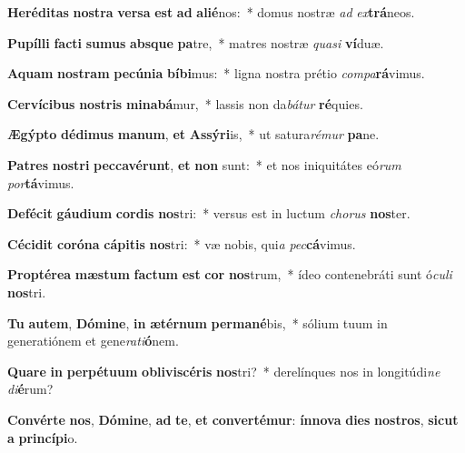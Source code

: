 \item \textbf{He}\textbf{ré}\textbf{di}\textbf{tas} \textbf{nos}\textbf{tra} \textbf{ver}\textbf{sa} \textbf{est} \textbf{ad} \textbf{a}\textbf{li}\textbf{é}nos:~* domus nostræ \textit{ad} \textit{ex}\textbf{trá}neos.
\item \textbf{Pu}\textbf{píl}\textbf{li} \textbf{fac}\textbf{ti} \textbf{su}\textbf{mus} \textbf{abs}\textbf{que} \textbf{pa}tre,~* matres nostræ \textit{qua}\textit{si} \textbf{ví}duæ.
\item \textbf{A}\textbf{quam} \textbf{nos}\textbf{tram} \textbf{pe}\textbf{cú}\textbf{ni}\textbf{a} \textbf{bí}\textbf{bi}mus:~* ligna nostra prétio \textit{com}\textit{pa}\textbf{rá}vimus.
\item \textbf{Cer}\textbf{ví}\textbf{ci}\textbf{bus} \textbf{nos}\textbf{tris} \textbf{mi}\textbf{na}\textbf{bá}mur,~* lassis non da\textit{bá}\textit{tur} \textbf{ré}quies.
\item \textbf{Æ}\textbf{gýp}\textbf{to} \textbf{dé}\textbf{di}\textbf{mus} \textbf{ma}\textbf{num}, \textbf{et} \textbf{As}\textbf{sý}\textbf{ri}is,~* ut satura\textit{ré}\textit{mur} \textbf{pa}ne.
\item \textbf{Pa}\textbf{tres} \textbf{nos}\textbf{tri} \textbf{pec}\textbf{ca}\textbf{vé}\textbf{runt}, \textbf{et} \textbf{non} sunt:~* et nos iniquitátes eó\textit{rum} \textit{por}\textbf{tá}vimus.
\item \textbf{De}\textbf{fé}\textbf{cit} \textbf{gáu}\textbf{di}\textbf{um} \textbf{cor}\textbf{dis} \textbf{nos}tri:~* versus est in luctum \textit{cho}\textit{rus} \textbf{nos}ter.
\item \textbf{Cé}\textbf{ci}\textbf{dit} \textbf{co}\textbf{ró}\textbf{na} \textbf{cá}\textbf{pi}\textbf{tis} \textbf{nos}tri:~* væ nobis, qui\textit{a} \textit{pec}\textbf{cá}vimus.
\item \textbf{Prop}\textbf{tér}\textbf{e}\textbf{a} \textbf{mæs}\textbf{tum} \textbf{fac}\textbf{tum} \textbf{est} \textbf{cor} \textbf{nos}trum,~* ídeo contenebráti sunt ó\textit{cu}\textit{li} \textbf{nos}tri.
\item \textbf{Tu} \textbf{au}\textbf{tem}, \textbf{Dó}\textbf{mi}\textbf{ne}, \textbf{in} \textbf{æ}\textbf{tér}\textbf{num} \textbf{per}\textbf{ma}\textbf{né}bis,~* sólium tuum in generatiónem et gene\textit{ra}\textit{ti}\textbf{ó}nem.
\item \textbf{Qua}\textbf{re} \textbf{in} \textbf{per}\textbf{pé}\textbf{tu}\textbf{um} \textbf{ob}\textbf{li}\textbf{vi}\textbf{scé}\textbf{ris} \textbf{nos}tri?~* derelínques nos in longitúdi\textit{ne} \textit{di}\textbf{é}rum?
\item \textbf{Con}\textbf{vér}\textbf{te} \textbf{nos}, \textbf{Dó}\textbf{mi}\textbf{ne}, \textbf{ad} \textbf{te}, \textbf{et} \textbf{con}\textbf{ver}\textbf{té}\textbf{mur}: \textbf{ín}\textbf{no}\textbf{va} \textbf{di}\textbf{es} \textbf{nos}\textbf{tros}, \textbf{sic}\textbf{ut} \textbf{a} \textbf{prin}\textbf{cí}\textbf{pi}o.
